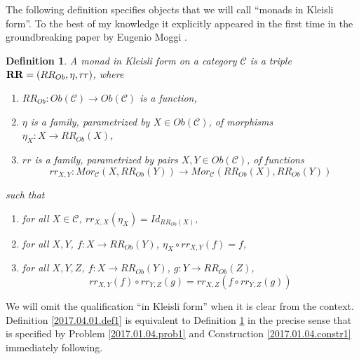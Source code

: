 \documentclass[12pt]{amsart}
\newtheorem{definition}[proposition]{Definition}
\newcommand{\llabel}[1]{\label{#1}}
\newcommand{\sr}{\rightarrow}
\newcommand{\RR}{{\bf RR}}
\newcommand{\C}{{\mathcal C}}
\begin{document}
The following definition specifies objects that we will call ``monads in
Kleisli form''. To the best of my knowledge it explicitly appeared in the first
time in the groundbreaking paper by Eugenio Moggi \cite{Moggi}.
%
\begin{definition}
\llabel{2017.04.13.def1}
A monad in Kleisli form on a category $\C$ is a triple $\RR=(RR_{Ob},\eta,rr)$, where 
%
\begin{enumerate}
\item \llabel{2017.04.19.eq1} $RR_{Ob}:Ob(\C)\sr Ob(\C)$ is a function,
\item \llabel{2017.04.19.eq2} $\eta$ is a family, parametrized by $X\in Ob(\C)$, of morphisms $\eta_X:X\sr RR_{Ob}(X)$,
\item \llabel{2017.04.19.eq3} $rr$ is a family, parametrized by pairs $X,Y\in Ob(\C)$, of functions 
%
$$rr_{X,Y}:Mor_{\C}(X,RR_{Ob}(Y))\sr Mor_{\C}(RR_{Ob}(X),RR_{Ob}(Y))$$
%
\end{enumerate}
%
such that
%
\begin{enumerate}[resume]
\item \llabel{2017.04.19.eq4} for all $X\in\C$, $rr_{X,X}(\eta_X)=Id_{RR_{Ob}(X)}$,
\item \llabel{2017.04.19.eq5} for all $X,Y$, $f:X\sr RR_{Ob}(Y)$, $\eta_X\circ rr_{X,Y}(f)=f$,
\item \llabel{2017.04.19.eq6} for all $X,Y,Z$, $f:X\sr RR_{Ob}(Y)$, $g:Y\sr RR_{Ob}(Z)$, 
%
$$rr_{X,Y}(f)\circ rr_{Y,Z}(g)=rr_{X,Z}(f\circ rr_{Y,Z}(g))$$
%
\end{enumerate}
\end{definition}
%
We will omit the qualification ``in Kleisli form'' when it is clear from the context. 
Definition \ref{2017.04.01.def1} is equivalent to Definition \ref{2017.04.13.def1} in the precise sense that is specified by Problem \ref{2017.01.04.prob1} and Construction \ref{2017.01.04.constr1} immediately following. 
%
\end{document}
